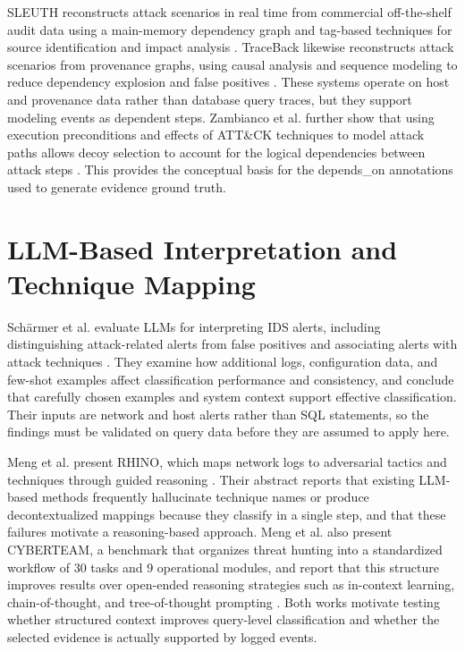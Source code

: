 \documentclass[12pt,a4paper]{report}
\begin{document}
SLEUTH reconstructs attack scenarios in real time from commercial off-the-shelf audit data using a main-memory dependency graph and tag-based techniques for source identification and impact analysis \cite{hossain_sleuth_nodate}. TraceBack likewise reconstructs attack scenarios from provenance graphs, using causal analysis and sequence modeling to reduce dependency explosion and false positives \cite{zhu_traceback_nodate}. These systems operate on host and provenance data rather than database query traces, but they support modeling events as dependent steps. Zambianco et al. further show that using execution preconditions and effects of ATT\&CK techniques to model attack paths allows decoy selection to account for the logical dependencies between attack steps \cite{zambianco_proactive_2025}. This provides the conceptual basis for the depends\_on annotations used to generate evidence ground truth.

\section{LLM-Based Interpretation and Technique Mapping}
Schärmer et al. evaluate LLMs for interpreting IDS alerts, including distinguishing attack-related alerts from false positives and associating alerts with attack techniques \cite{afzal_let_2027}. They examine how additional logs, configuration data, and few-shot examples affect classification performance and consistency, and conclude that carefully chosen examples and system context support effective classification. Their inputs are network and host alerts rather than SQL statements, so the findings must be validated on query data before they are assumed to apply here.

Meng et al. present RHINO, which maps network logs to adversarial tactics and techniques through guided reasoning \cite{meng_rhino_2025}. Their abstract reports that existing LLM-based methods frequently hallucinate technique names or produce decontextualized mappings because they classify in a single step, and that these failures motivate a reasoning-based approach. Meng et al. also present CYBERTEAM, a benchmark that organizes threat hunting into a standardized workflow of 30 tasks and 9 operational modules, and report that this structure improves results over open-ended reasoning strategies such as in-context learning, chain-of-thought, and tree-of-thought prompting \cite{meng_benchmarking_2026}. Both works motivate testing whether structured context improves query-level classification and whether the selected evidence is actually supported by logged events.
\end{document}
